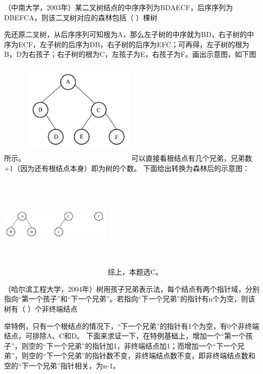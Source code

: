 \question （中南大学，2003年）某二叉树结点的中序序列为BDAECF，后序序列为DBEFCA，则该二叉树对应的森林包括（
）棵树
\par{}
\begin{solution}先还原二叉树，从后序序列可知根为A，那么左子树的中序就为BD，右子树的中序为ECF，左子树的后序为DB，右子树的后序为EFC；可再得，左子树的根为B，D为右孩子；右子树的根为C，左孩子为E，右孩子为F。画出示意图，如下图所示。
\includegraphics[width=2.08333in,height=2.08333in]{computerassets/bd459a854ebd7c5ece063bf107b6f012.jpeg}
可以直接看根结点有几个兄弟，兄弟数+1（因为还有根结点本身）即为树的个数。
下面给出转换为森林后的示意图：
\includegraphics[width=2.08333in,height=2.08333in]{computerassets/02d7f3ef22c9ad637a111d6ad3d5cc3d.jpeg}
综上，本题选C。
\end{solution}
\question （哈尔滨工程大学，2004年）树用孩子兄弟表示法，每个结点有两个指针域，分别指向``第一个孩子''和``下一个兄弟''。若指向``下一个兄弟''的指针有n个为空，则该树有（
）个非终端结点
\par{}
\begin{solution}举特例，只有一个根结点的情况下，``下一个兄弟''的指针有1个为空，有0个非终端结点，可排除A、C和D。
下面来求证一下，在特例基础上，增加一个``第一个孩子''，则空的``下一个兄弟''的指针加1，非终端结点加1；而增加一个``下一个兄弟''，则空的``下一个兄弟''的指针数不变，非终端结点数不变，即非终端结点数和空的``下一个兄弟''指针相关，为n-1。
\end{solution}
